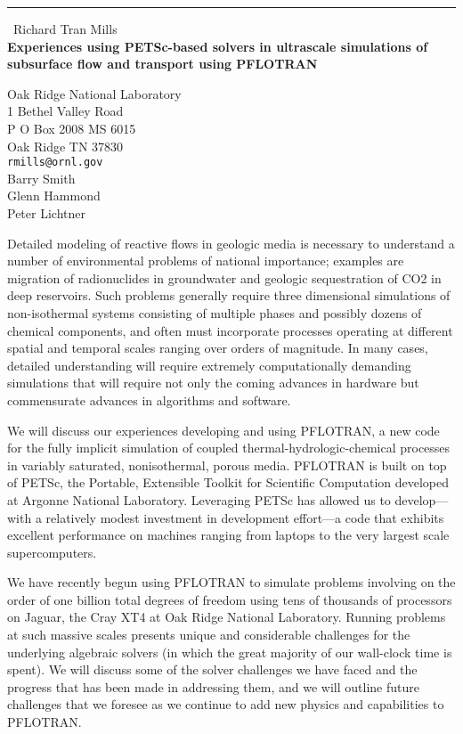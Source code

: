 \documentclass{report}
\begin{document}
\begin{center}
\rule{6in}{1pt} \
{\large Richard Tran Mills \\
{\bf Experiences using PETSc-based solvers in ultrascale simulations of subsurface flow and transport using PFLOTRAN}}

Oak Ridge National Laboratory \\ 1 Bethel Valley Road \\ P O Box 2008 MS 6015 \\ Oak Ridge TN 37830
\\
{\tt rmills@ornl.gov}\\
Barry Smith\\
Glenn Hammond\\
	Peter Lichtner\end{center}

Detailed modeling of reactive flows in geologic media is necessary to
understand a number of environmental problems of national importance;
examples are migration of radionuclides in groundwater and geologic
sequestration of CO2 in deep reservoirs. Such problems generally require
three dimensional simulations of non-isothermal systems consisting of
multiple phases and possibly dozens of chemical components, and often
must incorporate processes operating at different spatial and temporal
scales ranging over orders of magnitude. In many cases, detailed
understanding
will require extremely computationally demanding simulations that will
require not only the coming advances in hardware but commensurate
advances in algorithms and software.

We will discuss our experiences developing and using PFLOTRAN, a new code
for the fully implicit simulation of coupled thermal-hydrologic-chemical
processes in variably saturated, nonisothermal, porous media. PFLOTRAN is
built on top of PETSc, the Portable, Extensible Toolkit for Scientific
Computation developed at Argonne National Laboratory. Leveraging PETSc
has allowed us to develop---with a relatively modest investment in
development effort---a code that exhibits excellent performance on
machines ranging from laptops to the very largest scale supercomputers.

We have recently begun using PFLOTRAN to simulate problems involving on
the order of one billion total degrees of freedom using tens of thousands
of processors on Jaguar, the Cray XT4 at Oak Ridge National Laboratory.
Running problems at such massive scales presents unique and considerable
challenges for the underlying algebraic solvers (in which the great
majority of our wall-clock time is spent). We will discuss some of the
solver challenges we have faced and the progress that has been made in
addressing them, and we will outline future challenges
that we foresee as we continue to add new physics and capabilities to PFLOTRAN.
\end{document}
